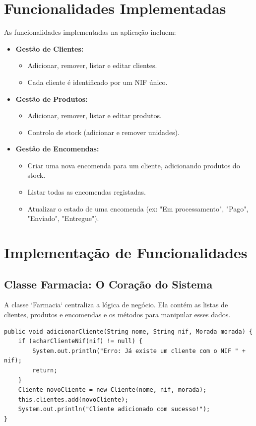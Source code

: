 \documentclass[a4paper,12pt]{article}
\begin{document}
\section{Funcionalidades Implementadas}
As funcionalidades implementadas na aplicação incluem:
\begin{itemize}
    \item \textbf{Gestão de Clientes:}
    \begin{itemize}
        \item Adicionar, remover, listar e editar clientes.
        \item Cada cliente é identificado por um NIF único.
    \end{itemize}
    \item \textbf{Gestão de Produtos:}
    \begin{itemize}
        \item Adicionar, remover, listar e editar produtos.
        \item Controlo de stock (adicionar e remover unidades).
    \end{itemize}
    \item \textbf{Gestão de Encomendas:}
    \begin{itemize}
        \item Criar uma nova encomenda para um cliente, adicionando produtos do stock.
        \item Listar todas as encomendas registadas.
        \item Atualizar o estado de uma encomenda (ex: "Em processamento", "Pago", "Enviado", "Entregue").
    \end{itemize}
\end{itemize}

\section{Implementação de Funcionalidades}

\subsection{Classe Farmacia: O Coração do Sistema}
A classe `Farmacia` centraliza a lógica de negócio. Ela contém as listas de clientes, produtos e encomendas e os métodos para manipular esses dados.

\begin{minipage}{\linewidth}
\begin{lstlisting}[caption={Método para adicionar um cliente em Farmacia.java}]
public void adicionarCliente(String nome, String nif, Morada morada) {
    if (acharClienteNif(nif) != null) {
        System.out.println("Erro: Já existe um cliente com o NIF " + nif);
        return;
    }
    Cliente novoCliente = new Cliente(nome, nif, morada);
    this.clientes.add(novoCliente);
    System.out.println("Cliente adicionado com sucesso!");
}
\end{lstlisting}
\end{minipage}
\end{document}
